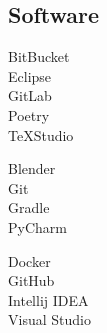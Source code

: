 \documentclass[curriculum-vitae-ita]{subfiles}
\begin{document}
		\subsection*{Software}
			\begin{minipage}[t]{.3\textwidth}
				BitBucket \hfill {}\\
				Eclipse \hfill {}\\
				GitLab \hfill {}\\
				Poetry \hfill {}\\
				\TeX Studio \hfill {}\\
			\end{minipage}
			\hfill
			\begin{minipage}[t]{.3\textwidth}
				Blender \hfill {}\\
				Git \hfill {}\\
				Gradle \hfill {}\\
				PyCharm \hfill {}\\
			\end{minipage}
			\hfill
			\begin{minipage}[t]{.3\textwidth}
				Docker \hfill {}\\
				GitHub \hfill {}\\
				Intellij IDEA \hfill {}\\
				Visual Studio \hfill {}\\
			\end{minipage}
		
\end{document}
